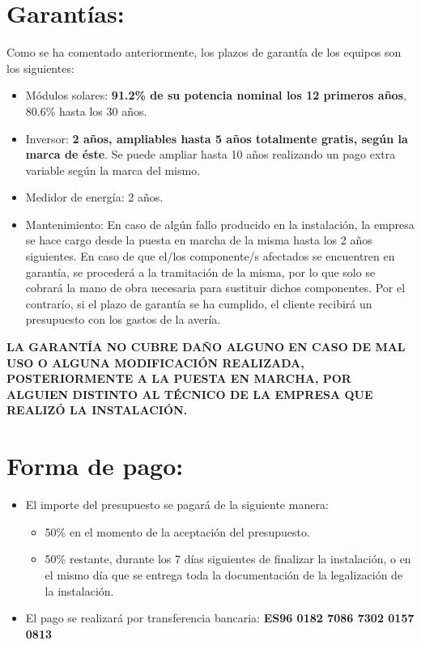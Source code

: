 \section*{Garantías:}
Como se ha comentado anteriormente, los plazos de garantía de los equipos son los siguientes:
\begin{itemize}
\item Módulos solares: \textbf{91.2\% de su potencia nominal los 12 primeros años}, 80.6\% hasta los 30 años.
\item Inversor: \textbf{2 años, ampliables hasta 5 años totalmente gratis, según la marca de éste}. Se puede ampliar hasta 10 años realizando un pago extra variable según la marca del mismo.
\item Medidor de energía: 2 años.
\item Mantenimiento: En caso de algún fallo producido en la instalación, la empresa se hace cargo desde la puesta en marcha de la misma hasta los 2 años siguientes. En caso de que el/los componente/s afectados se encuentren en garantía, se procederá a la tramitación de la misma, por lo que solo se cobrará la mano de obra necesaria para sustituir dichos componentes. Por el contrarío, si el plazo de garantía se ha cumplido, el cliente recibirá un presupuesto con los gastos de la avería.           
\end{itemize}
\textbf{LA GARANTÍA NO CUBRE DAÑO ALGUNO EN CASO DE MAL USO O ALGUNA MODIFICACIÓN REALIZADA, POSTERIORMENTE A LA PUESTA EN MARCHA, POR ALGUIEN DISTINTO AL TÉCNICO DE LA EMPRESA QUE REALIZÓ LA INSTALACIÓN. }

\section*{Forma de pago:}
				 
\begin{itemize}
\item El importe del presupuesto se pagará de la siguiente manera:
\begin{itemize}
\item 50\% en el momento de la aceptación del presupuesto.
\item 50\% restante, durante los 7 días siguientes de finalizar la instalación, o en el mismo día que se entrega toda la documentación de la legalización de la instalación. 
\end{itemize}
\item El pago se realizará por transferencia bancaria: \textbf{ES96 0182 7086 7302 0157 0813}
\end{itemize}

